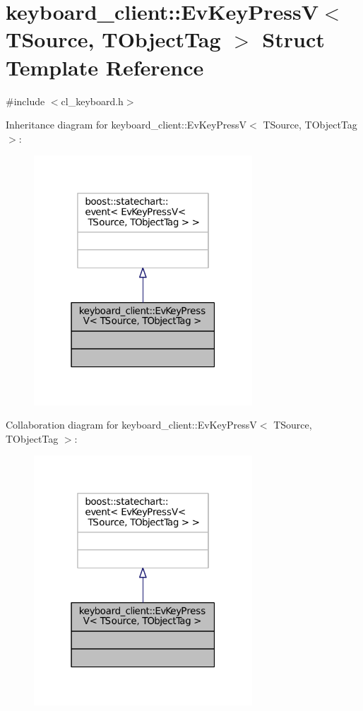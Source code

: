 \hypertarget{structkeyboard__client_1_1EvKeyPressV}{}\section{keyboard\+\_\+client\+:\+:Ev\+Key\+PressV$<$ T\+Source, T\+Object\+Tag $>$ Struct Template Reference}
\label{structkeyboard__client_1_1EvKeyPressV}


{\ttfamily \#include $<$cl\+\_\+keyboard.\+h$>$}



Inheritance diagram for keyboard\+\_\+client\+:\+:Ev\+Key\+PressV$<$ T\+Source, T\+Object\+Tag $>$\+:
\nopagebreak
\begin{figure}[H]
\begin{center}
\leavevmode
\includegraphics[width=232pt]{structkeyboard__client_1_1EvKeyPressV__inherit__graph}
\end{center}
\end{figure}


Collaboration diagram for keyboard\+\_\+client\+:\+:Ev\+Key\+PressV$<$ T\+Source, T\+Object\+Tag $>$\+:
\nopagebreak
\begin{figure}[H]
\begin{center}
\leavevmode
\includegraphics[width=232pt]{structkeyboard__client_1_1EvKeyPressV__coll__graph}
\end{center}
\end{figure}


